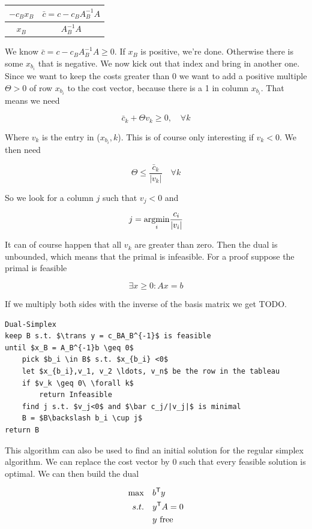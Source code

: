 \begin{center}
\begin{tabular}{c|c}
$-c_Bx_B$ & $\bar c = c-c_BA_B^{-1}A$\\\hline
$x_B$ & $A_B^{-1}A$
\end{tabular}
\end{center}

We know $\bar c = c-c_BA_B^{-1}A \geq 0$. If $x_B$ is positive, we're done. Otherwise there is some $x_{b_i}$ that is negative. We now kick out that index and bring in another one. Since we want to keep the costs greater than 0 we want to add a positive multiple $\Theta > 0$ of row $x_{b_i}$ to the cost vector, because there is a 1 in column $x_{b_i}$. That means we need

\[\bar c_k + \Theta v_k \geq 0,\quad \forall k\]

Where $v_k$ is the entry in ($x_{b_i}, k$). This is of course only interesting if $v_k<0$. We then need 

\[ \Theta \leq \frac{\bar c_k}{|v_k|} \quad \forall k\]

So we look for a column $j$ such that $v_j<0$ and 

\[j = \underset{i}{\operatorname{argmin}} \frac{c_i}{|v_i|}\]

It can of course happen that all $v_k$ are greater than zero. Then the dual is unbounded, which means that the primal is infeasible. For a proof suppose the primal is feasible

\[\exists x\geq 0: Ax=b\]

If we multiply both sides with the inverse of the basis matrix we get TODO.

\begin{lstlisting}
Dual-Simplex
keep B s.t. $\trans y = c_BA_B^{-1}$ is feasible
until $x_B = A_B^{-1}b \geq 0$
	pick $b_i \in B$ s.t. $x_{b_i} <0$
	let $x_{b_i},v_1, v_2 \ldots, v_n$ be the row in the tableau
	if $v_k \geq 0\ \forall k$
		return Infeasible
	find j s.t. $v_j<0$ and $\bar c_j/|v_j|$ is minimal
	B = $B\backslash b_i \cup j$
return B
\end{lstlisting}

This algorithm can also be used to find an initial solution for the regular simplex algorithm. We can replace the cost vector by $0$ such that every feasible solution is optimal. We can then build the dual

\begin{align*}
\max \quad & {b}^\text{\upshape \sffamily T} y\\
s.t.\quad & {y}^\text{\upshape \sffamily T} A = 0\\
&y \text{ free}
\end{align*}